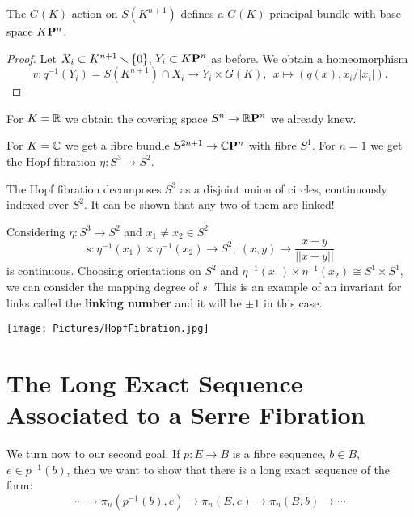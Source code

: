 \begin{proposition}
The $G(K)$-action on $S(K^{n+1})$ defines a $G(K)$-principal bundle with base space ${K\mathbf{P}^n}$.
\end{proposition}

\begin{proof}
Let $X_i\subset K^{n+1}\smallsetminus\{0\}$, $Y_i\subset {K\mathbf{P}^n}$ as before. We obtain a homeomorphism
\[v:q^{-1}(Y_i)=S(K^{n+1})\cap X_i\to Y_i\times G(K),\ \ x\mapsto (q(x),x_i/|x_i|).\]
\end{proof}

For $K={\mathbb R}$ we obtain the covering space $S^n\to{{\mathbb R}\mathbf{P}^n}$ we already knew.

For $K=\mathbb{C}$ we get a fibre bundle $S^{2n+1}\to{\mathbb{C}\mathbf{P}^n}$ with fibre $S^1$. For $n=1$ we get the Hopf fibration $\eta:S^3\to S^2$.

\begin{remark}
The Hopf fibration decomposes $S^3$ as a disjoint union of circles, continuously indexed over $S^2$.
It can be shown that any two of them are linked!

Considering $\eta:S^3\to S^2$ and $x_1\neq x_2\in S^2$
\[s:\eta^{-1}(x_1)\times\eta^{-1}(x_2)\to S^2,\ (x,y)\to\frac{x-y}{||x-y||}\]
is continuous. Choosing orientations on $S^2$ and $\eta^{-1}(x_1)\times\eta^{-1}(x_2)\cong S^1\times S^1$, we can consider the mapping degree of $s$. This is an example of an invariant for links called the \textbf{linking number} and it will be $\pm1$ in this case.
\end{remark}\smallskip

\begin{center}
    \texttt{[image: Pictures/HopfFibration.jpg]}
\end{center}

\section{The Long Exact Sequence Associated to a Serre Fibration}

We turn now to our second goal. If $p:E\to B$ is a fibre sequence, $b\in B$, $e\in p^{-1}(b)$, then we want to show that there is a long exact sequence of the form:
\[\cdots\to\pi_n(p^{-1}(b),e)\to\pi_n(E,e)\to\pi_n(B,b)\to\cdots\]

